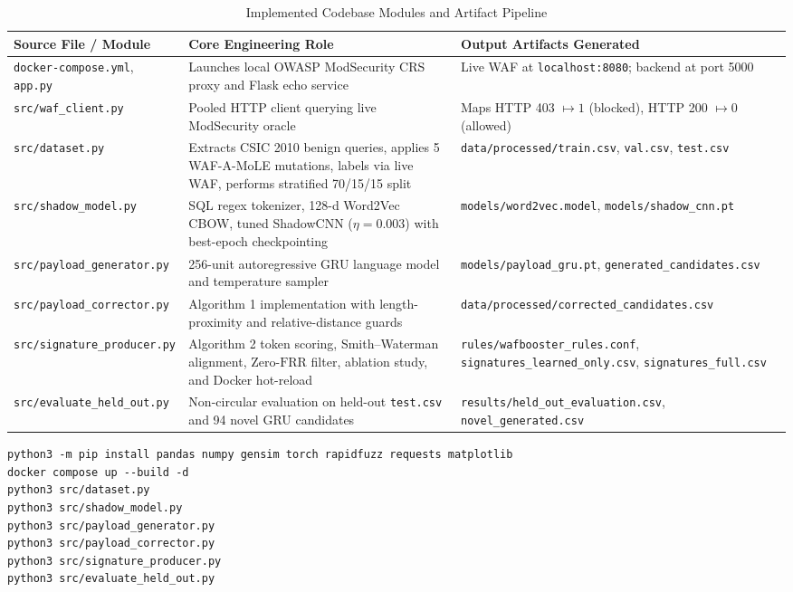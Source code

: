\documentclass[conference]{IEEEtran}
\newcommand{\FRR}{\ensuremath{\mathrm{FRR}}}
\begin{document}
\begin{table}[t]
\centering
\caption{Implemented Codebase Modules and Artifact Pipeline}
\label{tab:modules}
\scriptsize
\begin{tabular}{L{3.5cm}L{6.2cm}L{6.5cm}}
\toprule
Source File / Module & Core Engineering Role & Output Artifacts Generated\\
\midrule
\texttt{docker-compose.yml}, \texttt{app.py} & Launches local OWASP ModSecurity CRS proxy and Flask echo service & Live WAF at \texttt{localhost:8080}; backend at port 5000\\
\texttt{src/waf\_client.py} & Pooled HTTP client querying live ModSecurity oracle & Maps HTTP 403 $\mapsto 1$ (blocked), HTTP 200 $\mapsto 0$ (allowed)\\
\texttt{src/dataset.py} & Extracts CSIC 2010 benign queries, applies 5 WAF-A-MoLE mutations, labels via live WAF, performs stratified 70/15/15 split & \texttt{data/processed/train.csv}, \texttt{val.csv}, \texttt{test.csv}\\
\texttt{src/shadow\_model.py} & SQL regex tokenizer, 128-d Word2Vec CBOW, tuned ShadowCNN ($\eta=0.003$) with best-epoch checkpointing & \texttt{models/word2vec.model}, \texttt{models/shadow\_cnn.pt}\\
\texttt{src/payload\_generator.py} & 256-unit autoregressive GRU language model and temperature sampler & \texttt{models/payload\_gru.pt}, \texttt{generated\_candidates.csv}\\
\texttt{src/payload\_corrector.py} & Algorithm 1 implementation with length-proximity and relative-distance guards & \texttt{data/processed/corrected\_candidates.csv}\\
\texttt{src/signature\_producer.py} & Algorithm 2 token scoring, Smith--Waterman alignment, Zero-\FRR{} filter, ablation study, and Docker hot-reload & \texttt{rules/wafbooster\_rules.conf}, \texttt{signatures\_learned\_only.csv}, \texttt{signatures\_full.csv}\\
\texttt{src/evaluate\_held\_out.py} & Non-circular evaluation on held-out \texttt{test.csv} and 94 novel GRU candidates & \texttt{results/held\_out\_evaluation.csv}, \texttt{novel\_generated.csv}\\
\bottomrule
\end{tabular}
\end{table}

\begin{lstlisting}[basicstyle=\ttfamily\scriptsize,frame=single,breaklines=true,caption={End-to-End Reproduction Commands}]
python3 -m pip install pandas numpy gensim torch rapidfuzz requests matplotlib
docker compose up --build -d
python3 src/dataset.py
python3 src/shadow_model.py
python3 src/payload_generator.py
python3 src/payload_corrector.py
python3 src/signature_producer.py
python3 src/evaluate_held_out.py
\end{lstlisting}
\end{document}
